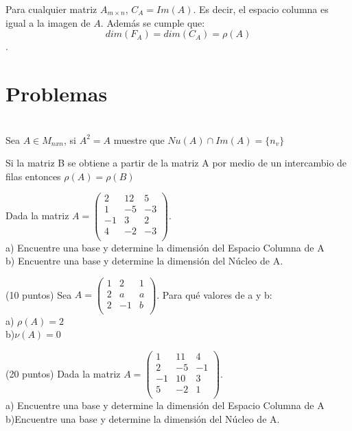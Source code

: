 \begin{obsimp}
Para cualquier matriz $A_{m\times n}$, $C_A = Im(A)$. Es decir, el espacio columna es igual a la imagen de $A$. Además se cumple que: $$dim(F_A) = dim(C_A) = \rho(A)$$.
\end{obsimp}

\newpage
\section{Problemas}
\begin{enumerate}
\begin{prop}[]

~\\Sea $A \in M_{nxn} $, si $A^2=A$ muestre que $Nu(A)\cap Im(A)=\{n_v\}$
\end{prop}

\begin{prop}

Si la matriz B se obtiene a partir de la matriz A por medio de un intercambio de filas entonces $\rho(A)=\rho(B)$
\end{prop}

\begin{prob}[]
Dada la matriz $A=\left(\begin{array}{rrr}
2&12&5\\
1&-5&-3\\
-1&3&2\\
4&-2&-3\\
\end{array}\right)$. ~\\
a) Encuentre una base y determine la dimensi\'on del Espacio Columna de A~\\
b) Encuentre una base y determine la dimensi\'on del N\'ucleo de A.
\end{prob}


\begin{prob}
(10 puntos) Sea $A=\left(\begin{matrix}
1&2&1\\
2&a&a\\
2&-1&b\\
\end{matrix}\right)$. Para qu\'e valores de a y b:~\\
a) $\rho(A)=2$~\\
b)$\nu(A)=0$ 
\end{prob}


\begin{prob}
(20 puntos) Dada la matriz $A=\left(\begin{array}{rrr}
1&11&4\\
2&-5&-1\\
-1&10&3\\
5&-2&1\\
\end{array}\right)$. ~\\
a) Encuentre una base y determine la dimensi\'on del Espacio Columna de A~\\
b)Encuentre una base y determine la dimensi\'on del N\'ucleo de A.
\end{prob}



\end{enumerate}